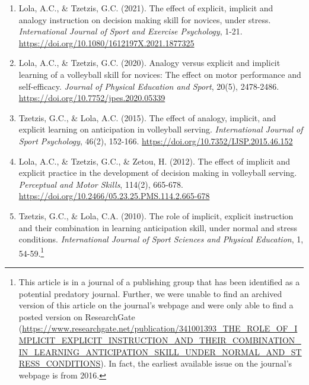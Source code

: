 \documentclass[
  english,
  man,floatsintext]{apa7}
\begin{document}
\begin{enumerate}
\def\labelenumi{\arabic{enumi}.}
\item
  Lola, A.C., \& Tzetzis, G.C. (2021). The effect of explicit, implicit and analogy instruction on decision making skill for novices, under stress. \emph{International Journal of Sport and Exercise Psychology}, 1-21. \url{https://doi.org/10.1080/1612197X.2021.1877325}
\item
  Lola, A.C., \& Tzetzis, G.C. (2020). Analogy versus explicit and implicit learning of a volleyball skill for novices: The effect on motor performance and self-efficacy. \emph{Journal of Physical Education and Sport}, 20(5), 2478-2486. \url{https://doi.org/10.7752/jpes.2020.05339}
\item
  Tzetzis, G.C., \& Lola, A.C. (2015). The effect of analogy, implicit, and explicit learning on anticipation in volleyball serving. \emph{International Journal of Sport Psychology}, 46(2), 152-166. \url{https://doi.org/10.7352/IJSP.2015.46.152}
\item
  Lola, A.C., \& Tzetzis, G.C., \& Zetou, H. (2012). The effect of implicit and explicit practice in the development of decision making in volleyball serving. \emph{Perceptual and Motor Skills}, 114(2), 665-678. \url{https://doi.org/10.2466/05.23.25.PMS.114.2.665-678}
\item
  Tzetzis, G.C., \& Lola, C.A. (2010). The role of implicit, explicit instruction and their combination in learning anticipation skill, under normal and stress conditions. \emph{International Journal of Sport Sciences and Physical Education}, 1, 54-59.\footnote{This article is in a journal of a publishing group that has been identified as a potential predatory journal. Further, we were unable to find an archived version of this article on the journal's webpage and were only able to find a posted version on ResearchGate (\url{https://www.researchgate.net/publication/341001393_THE_ROLE_OF_IMPLICIT_EXPLICIT_INSTRUCTION_AND_THEIR_COMBINATION_IN_LEARNING_ANTICIPATION_SKILL_UNDER_NORMAL_AND_STRESS_CONDITIONS}). In fact, the earliest available issue on the journal's webpage is from 2016.}
\end{enumerate}
\end{document}
